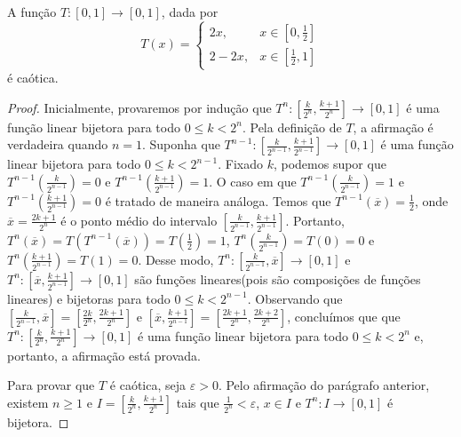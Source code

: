 
\begin{lemma}
\label{lema conjugacaotopologica 1}
A função $T: [0,1] \to [0,1]$, dada por
\[
T(x) = 
  \begin{cases}
      2x, & x \in [0, \frac{1}{2}] \\
      2 - 2x, & x \in [\frac{1}{2}, 1] 
  \end{cases}
\]
é caótica.
\end{lemma}

\begin{proof}
Inicialmente, provaremos por indução que $T^n: \left[\frac{k}{2^n}, \frac{k+1}{2^n}\right] \to [0,1]$ é uma função linear bijetora para todo $0 \leq k  < 2^n$. Pela definição de $T$, a afirmação é verdadeira quando $n = 1$. Suponha que $T^{n-1}: \left[\frac{k}{2^{n-1}}, \frac{k+1}{2^{n-1}}\right] \to [0,1]$ é uma função linear bijetora para todo $0 \leq k < 2^{n-1}$. Fixado $k$, podemos supor que $T^{n-1}\left(\frac{k}{2^{n-1}}\right) = 0$ e $T^{n-1}\left(\frac{k+1}{2^{n-1}}\right) = 1$. O caso em que $T^{n-1}\left(\frac{k}{2^{n-1}}\right) = 1$ e $T^{n-1}\left(\frac{k+1}{2^{n-1}}\right) = 0$ é tratado de maneira análoga. Temos que $T^{n-1}(\overline{x}) = \frac{1}{2}$, onde $\overline{x} = \frac{2k+1}{2^n}$ é o ponto médio do intervalo $\left[\frac{k}{2^{n-1}}, \frac{k+1}{2^{n-1}}\right]$. Portanto, $T^n(\overline{x}) = T(T^{n-1}(\overline{x})) = T\left(\frac{1}{2}\right) = 1$, $T^n\left(\frac{k}{2^{n-1}}\right) = T(0) = 0$ e $T^n\left(\frac{k+1}{2^{n-1}}\right) = T(1) = 0$. Desse modo, $T^n: \left[\frac{k}{2^{n-1}}, \overline{x}\right] \to [0,1]$ e $T^n: \left[\overline{x}, \frac{k+1}{2^{n-1}}\right] \to [0,1]$ são funções lineares(pois são composições de funções lineares) e bijetoras para todo $0 \leq k < 2^{n-1}$. Observando que $\left[\frac{k}{2^{n-1}}, \overline{x}\right] =  \left[\frac{2k}{2^n}, \frac{2k+1}{2^n}\right]$ e $\left[\overline{x}, \frac{k+1}{2^{n-1}}\right] =  \left[\frac{2k+1}{2^n}, \frac{2k+2}{2^n}\right]$, concluímos que  que $T^n: \left[\frac{k}{2^n}, \frac{k+1}{2^n}\right] \to [0,1]$ é uma função linear bijetora para todo $0 \leq k  < 2^n$ e, portanto, a afirmação está provada.

Para provar que $T$ é caótica, seja $\varepsilon > 0$. Pelo afirmação do parágrafo anterior, existem $n \geq 1$ e $I = \left[\frac{k}{2^n}, \frac{k+1}{2^n}\right]$  tais que $\frac{1}{2^n} < \varepsilon$, $x \in I$ e $T^n: I \to [0,1]$ é bijetora.


\end{proof}

